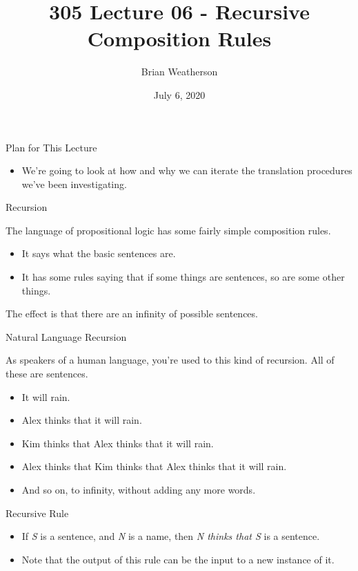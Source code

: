 \documentclass[
  ignorenonframetext,
]{beamer}
\title{305 Lecture 06 - Recursive Composition Rules}
\author{Brian Weatherson}
\date{July 6, 2020}
\providecommand{\tightlist}{%
  \setlength{\itemsep}{0pt}\setlength{\parskip}{0pt}}
\renewcommand{\,}{\text{, }}
\begin{document}
\frame{\titlepage}

\begin{frame}{Plan for This Lecture}
\protect\hypertarget{plan-for-this-lecture}{}

\begin{itemize}
\tightlist
\item
  We're going to look at how and why we can iterate the translation
  procedures we've been investigating.
\end{itemize}

\end{frame}

\begin{frame}{Recursion}
\protect\hypertarget{recursion}{}

The language of propositional logic has some fairly simple composition
rules.

\begin{itemize}
\tightlist
\item
  It says what the basic sentences are.
\item
  It has some rules saying that if some things are sentences, so are
  some other things.
\end{itemize}

The effect is that there are an infinity of possible sentences.

\end{frame}

\begin{frame}{Natural Language Recursion}
\protect\hypertarget{natural-language-recursion}{}

As speakers of a human language, you're used to this kind of recursion.
All of these are sentences.

\begin{itemize}[<+->]
\tightlist
\item
  It will rain.
\item
  Alex thinks that it will rain.
\item
  Kim thinks that Alex thinks that it will rain.
\item
  Alex thinks that Kim thinks that Alex thinks that it will rain.
\item
  And so on, to infinity, without adding any more words.
\end{itemize}

\end{frame}

\begin{frame}{Recursive Rule}
\protect\hypertarget{recursive-rule}{}

\begin{itemize}
\tightlist
\item
  If \emph{S} is a sentence, and \emph{N} is a name, then \emph{N thinks
  that S} is a sentence.
\item
  Note that the output of this rule can be the input to a new instance
  of it.
\end{itemize}

\end{frame}
\end{document}
